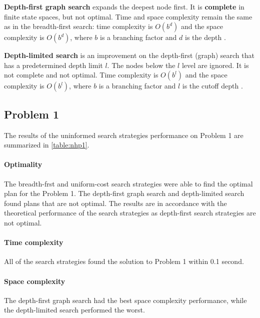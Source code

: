 \documentclass[11pt]{article}
\begin{document}
\textbf{Depth-first graph search} expands the deepest node first. It is \textbf{complete} in finite state spaces, but not optimal. Time and space complexity remain the same as in the breadth-first search: time complexity is $O(b^d)$ and the space complexity is $O(b^d)$, where $b$ is a branching factor and $d$ is the depth \autocite{russell2010artificial}.

\textbf{Depth-limited search} is an improvement on the depth-first (graph) search that has a predetermined depth limit $l$. The nodes below the $l$ level are ignored. It is not complete and not optimal. Time complexity is $O(b^l)$ and the space complexity is $O(b^l)$, where $b$ is a branching factor and $l$ is the cutoff depth \autocite{russell2010artificial}.

\subsection{Problem 1}

The results of the uninformed search strategies performance on Problem 1 are summarized in \ref{table:nhp1}.

\paragraph{Optimality}

The breadth-frst and uniform-cost search strategies were able to find the optimal plan for the Problem 1. The depth-first graph search and depth-limited search found plans that are not optimal. The results are in accordance with the theoretical performance of the search strategies as depth-first search strategies are not optimal.

\paragraph{Time complexity}

All of the search strategies found the solution to Problem 1 within 0.1 second.

\paragraph{Space complexity}

The depth-first graph search had the best space complexity performance, while the depth-limited search performed the worst.
\end{document}
